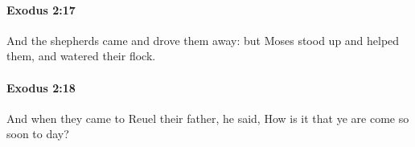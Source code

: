 		\paragraph{Exodus 2:17} %
			\label{EXODUS-2-17}

			And the shepherds came and drove them away: but Moses stood up and helped them, and watered their flock.


		\paragraph{Exodus 2:18} %
			\label{EXODUS-2-18}

			And when they came to Reuel their father, he said, How is it that ye are come so soon to day?


